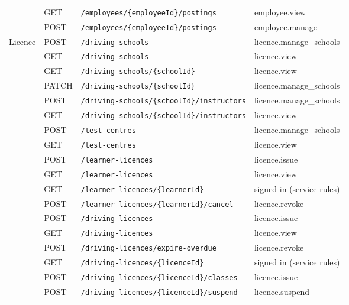 \begin{longtable}{@{}p{2.1cm}l p{6.6cm} p{3.2cm}@{}}
 & GET & \texttt{/\allowbreak{}employees/\allowbreak{}\{employeeId\}/\allowbreak{}postings} & employee.view \\
 & POST & \texttt{/\allowbreak{}employees/\allowbreak{}\{employeeId\}/\allowbreak{}postings} & employee.manage \\
Licence & POST & \texttt{/\allowbreak{}driving-schools} & licence.manage\_\allowbreak{}schools \\
 & GET & \texttt{/\allowbreak{}driving-schools} & licence.view \\
 & GET & \texttt{/\allowbreak{}driving-schools/\allowbreak{}\{schoolId\}} & licence.view \\
 & PATCH & \texttt{/\allowbreak{}driving-schools/\allowbreak{}\{schoolId\}} & licence.manage\_\allowbreak{}schools \\
 & POST & \texttt{/\allowbreak{}driving-schools/\allowbreak{}\{schoolId\}/\allowbreak{}instructors} & licence.manage\_\allowbreak{}schools \\
 & GET & \texttt{/\allowbreak{}driving-schools/\allowbreak{}\{schoolId\}/\allowbreak{}instructors} & licence.view \\
 & POST & \texttt{/\allowbreak{}test-centres} & licence.manage\_\allowbreak{}schools \\
 & GET & \texttt{/\allowbreak{}test-centres} & licence.view \\
 & POST & \texttt{/\allowbreak{}learner-licences} & licence.issue \\
 & GET & \texttt{/\allowbreak{}learner-licences} & licence.view \\
 & GET & \texttt{/\allowbreak{}learner-licences/\allowbreak{}\{learnerId\}} & signed in (service rules) \\
 & POST & \texttt{/\allowbreak{}learner-licences/\allowbreak{}\{learnerId\}/\allowbreak{}cancel} & licence.revoke \\
 & POST & \texttt{/\allowbreak{}driving-licences} & licence.issue \\
 & GET & \texttt{/\allowbreak{}driving-licences} & licence.view \\
 & POST & \texttt{/\allowbreak{}driving-licences/\allowbreak{}expire-overdue} & licence.revoke \\
 & GET & \texttt{/\allowbreak{}driving-licences/\allowbreak{}\{licenceId\}} & signed in (service rules) \\
 & POST & \texttt{/\allowbreak{}driving-licences/\allowbreak{}\{licenceId\}/\allowbreak{}classes} & licence.issue \\
 & POST & \texttt{/\allowbreak{}driving-licences/\allowbreak{}\{licenceId\}/\allowbreak{}suspend} & licence.suspend \\

\end{longtable}
